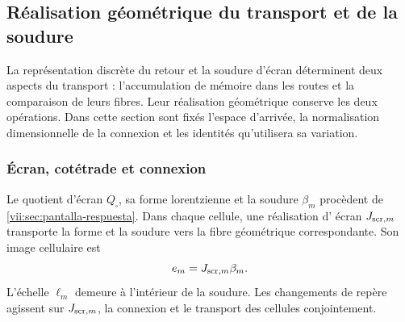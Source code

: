 
\subsection{Réalisation géométrique du transport et de la soudure}
\label{vii:sec:realizacion-cartan}

La représentation discrète du retour et la soudure d'écran déterminent deux aspects du transport : l'accumulation de mémoire dans les routes et la comparaison de leurs fibres. Leur réalisation géométrique conserve les deux opérations. Dans cette section sont fixés l'espace d'arrivée, la normalisation dimensionnelle de la connexion et les identités qu'utilisera sa variation.

\subsubsection{Écran, cotétrade et connexion}

Le quotient d'écran \(Q_\square\), sa forme lorentzienne et la
soudure \(\beta_m\) procèdent de
\ref{vii:sec:pantalla-respuesta}. Dans chaque cellule, une réalisation d'
écran \(J_{{\rm scr},m}\) transporte la forme et la soudure
vers la fibre géométrique correspondante. Son image cellulaire est
\[
 e_m=J_{{\rm scr},m}\beta_m.
\]
L'échelle \(\ell_m\) demeure à l'intérieur de la soudure. Les
changements de repère agissent sur \(J_{{\rm scr},m}\), la connexion
et le transport des cellules conjointement.


